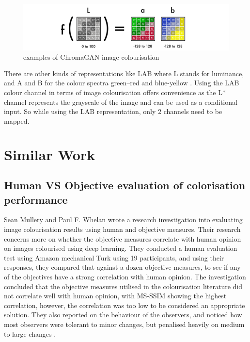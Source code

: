 \begin{figure}[H]
    \centering
    \includegraphics[width=0.6\columnwidth]{sections/figures/lab.png}
    \caption{examples of ChromaGAN image colourisation}
    \label{fig:my_label}
\end{figure}

There are other kinds of representations like LAB where L stands for luminance, and A and B for the colour spectra green–red and blue-yellow \cite{enwiki:1077444859}. Using the LAB colour channel in terms of image colourisation offers convenience as the L* channel represents the grayscale of the image and can be used as a conditional input. So while using the LAB representation, only 2 channels need to be mapped.


\pagebreak
\section{Similar Work}
\subsection{Human VS Objective evaluation of colorisation
performance}
Sean Mullery and Paul F. Whelan wrote a research investigation into evaluating image colourisation results using human and objective measures. Their research concerns more on whether the objective measures correlate with human opinion on images colourised using deep learning. They conducted a human evaluation test using Amazon mechanical Turk using 19 participants, and using their responses, they compared that against a dozen objective measures, to see if any of the objectives have a strong correlation with human opinion. 
The investigation concluded that the objective measures utilised in the colourisation literature did not correlate well with human opinion, with MS-SSIM showing the highest correlation, however, the correlation was too low to be considered an appropriate solution. They also reported on the behaviour of the observers, and noticed how most observers were tolerant to minor changes, but penalised heavily on medium to large changes \cite{https://doi.org/10.48550/arxiv.2204.05200}. 

